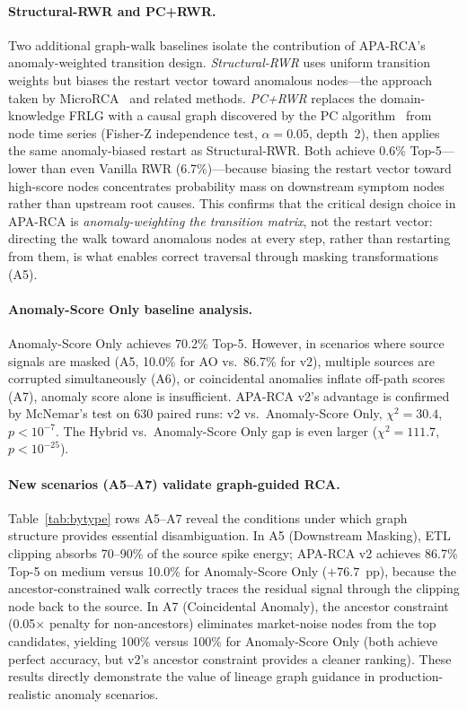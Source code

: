 \documentclass{article}
\newcommand{\aparca}{\textsc{APA-RCA}}
\begin{document}
\paragraph{Structural-RWR and PC+RWR.}
Two additional graph-walk baselines isolate the contribution of \aparca{}'s
anomaly-weighted transition design.
\emph{Structural-RWR} uses uniform transition weights but biases the restart
vector toward anomalous nodes---the approach taken by MicroRCA~\cite{wu2020microrca}
and related methods.
\emph{PC+RWR} replaces the domain-knowledge FRLG with a causal graph
discovered by the PC algorithm~\cite{spirtes2000causation} from node time series
(Fisher-Z independence test, $\alpha=0.05$, depth~2), then applies the same
anomaly-biased restart as Structural-RWR.
Both achieve 0.6\% Top-5---lower than even Vanilla RWR (6.7\%)---because
biasing the restart vector toward high-score nodes concentrates probability
mass on downstream symptom nodes rather than upstream root causes.
This confirms that the critical design choice in \aparca{} is
\emph{anomaly-weighting the transition matrix}, not the restart vector:
directing the walk toward anomalous nodes at every step, rather than
restarting from them, is what enables correct traversal through masking
transformations (A5).

\paragraph{Anomaly-Score Only baseline analysis.}
Anomaly-Score Only achieves 70.2\% Top-5. However, in scenarios where source
signals are masked (A5, 10.0\% for AO vs.\ 86.7\% for v2), multiple sources
are corrupted simultaneously (A6), or coincidental anomalies inflate off-path
scores (A7), anomaly score alone is insufficient.
\aparca{} v2's advantage is confirmed by McNemar's test on 630 paired runs:
v2 vs.\ Anomaly-Score Only, $\chi^2=30.4$, $p<10^{-7}$.
The Hybrid vs.\ Anomaly-Score Only gap is even larger ($\chi^2=111.7$, $p<10^{-25}$).

\paragraph{New scenarios (A5--A7) validate graph-guided RCA.}
Table~\ref{tab:bytype} rows A5--A7 reveal the conditions under which graph
structure provides essential disambiguation.
In A5 (Downstream Masking), ETL clipping absorbs 70--90\% of the source spike
energy; \aparca{} v2 achieves 86.7\% Top-5 on medium versus 10.0\% for Anomaly-Score
Only ($+76.7$~pp), because the ancestor-constrained walk correctly traces the
residual signal through the clipping node back to the source.
In A7 (Coincidental Anomaly), the ancestor constraint (0.05$\times$ penalty
for non-ancestors) eliminates market-noise nodes from the top candidates,
yielding 100\% versus 100\% for Anomaly-Score Only (both achieve perfect
accuracy, but v2's ancestor constraint provides a cleaner ranking).
These results directly demonstrate the value of lineage graph guidance in
production-realistic anomaly scenarios.
\end{document}
